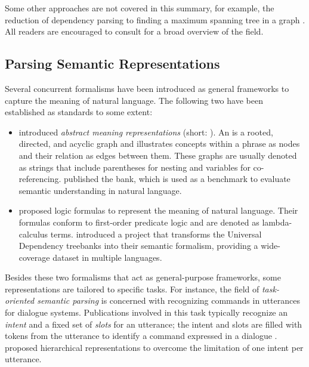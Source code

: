 \documentclass[../document.tex]{subfiles}
\begin{document}
    Some other approaches are not covered in this summary, for example, the reduction of dependency parsing to finding a maximum spanning tree in a graph \citep{mcdonald-etal-2005-non}.
    All readers are encouraged to consult \citet{nivre2010dependency} for a broad overview of the field.

    \subsection{Parsing Semantic Representations}
    Several concurrent formalisms have been introduced as general frameworks to capture the meaning of natural language.
    The following two have been established as standards to some extent:
    \begin{itemize}
        \item {} introduced \emph{abstract meaning representations} (short: ).
            An  is a rooted, directed, and acyclic graph and illustrates concepts within a phrase as nodes and their relation as edges between them.
            These graphs are usually denoted as strings that include parentheses for nesting and variables for co-referencing.
             published the  bank, which is used as a benchmark to evaluate semantic understanding in natural language.
        \item {} proposed logic formulas to represent the meaning of natural language.
            Their formulas conform to first-order predicate logic and are denoted as lambda-calculus terms.
             introduced a project that transforms the Universal Dependency treebanks \citep{de2021universal} into their semantic formalism, providing a wide-coverage dataset in multiple languages.
    \end{itemize}
    Besides these two formalisms that act as general-purpose frameworks, some representations are tailored to specific tasks.
    For instance, the field of \emph{task-oriented semantic parsing} is concerned with recognizing commands in utterances for dialogue systems.
    Publications involved in this task typically recognize an \emph{intent} and a fixed set of \emph{slots} for an utterance; the intent and slots are filled with tokens from the utterance to identify a command expressed in a dialogue \citep{mesnil2013investigation}.
     proposed hierarchical representations to overcome the limitation of one intent per utterance.
\end{document}
